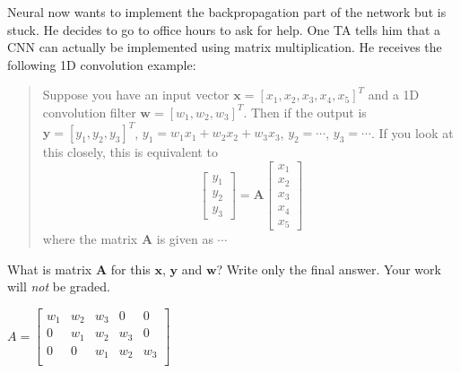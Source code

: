 \documentclass[11pt,addpoints,answers]{exam}
\newcommand{\wv}{\mathbf{w}}
\newcommand{\xv}{\mathbf{x}}
\newcommand{\yv}{\mathbf{y}}
\newcommand{\Av}{\mathbf{A}}
\begin{document}
\begin{questions}
\begin{parts}
\begin{subparts}
\newpage

\subpart[2] Neural now wants to implement the backpropagation part of the network but is stuck. He decides to go to office hours to ask for help. One TA tells him that a CNN can actually be implemented using matrix multiplication. He receives the following 1D convolution example:
\begin{quote}
    Suppose you have an input vector $\xv = [x_1, x_2, x_3, x_4, x_5]^T$ and a 1D convolution filter $\wv = [w_1, w_2, w_3]^T$. Then if the output is $\yv = [y_1, y_2, y_3]^T$, $y_1 = w_1 x_1 + w_2 x_2 + w_3 x_3$, $y_2 = \cdots$, $y_3 = \cdots$. If you look at this closely, this is equivalent to
    \[
    \begin{bmatrix} y_1 \\ y_2 \\ y_3 \end{bmatrix} = \Av \begin{bmatrix} x_1 \\ x_2 \\ x_3 \\ x_4 \\ x_5 \end{bmatrix}
    \]
    where the matrix $\Av$ is given as $\cdots$
\end{quote}
What is matrix $\Av$ for this $\xv$, $\yv$ and $\wv$? Write only the final answer. Your work will \textit{not} be graded. \\
    \begin{your_solution}[height=5cm]
    
    $A = \begin{bmatrix}
	w_1 & w_2 & w_3 & 0 & 0 \\
	0 & w_1 & w_2 & w_3 & 0 \\
	0 & 0 & w_1 & w_2 & w_3 \\
	\end{bmatrix}$    
    \end{your_solution}

\vspace{5mm}


\end{subparts}
\end{parts}
\end{questions}
\end{document}
